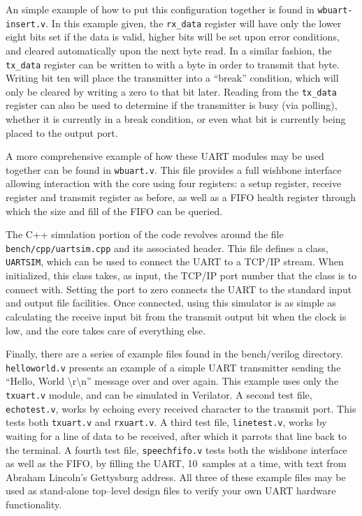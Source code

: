 \documentclass{gqtekspec}
\begin{document}
An simple example of how to put this configuration together is found in
{\tt wbuart-insert.v}.  In this example given, the {\tt rx\_data} register
will have only the lower eight bits set if the data is valid, higher bits will
be set upon error conditions, and cleared automatically upon the next byte read.
In a similar fashion, the {\tt tx\_data} register can be written to with a byte
in order to transmit that byte.  Writing bit ten will place the transmitter
into a ``break'' condition, which will only be cleared by writing a zero to
that bit later.
Reading from the {\tt tx\_data} register can also be used to determine if the
transmitter is busy (via polling), whether it is currently in a break condition,
or even what bit is currently being placed to the output port.

A more comprehensive example of how these UART modules may be used together
can be found in {\tt wbuart.v}.  This file provides a full wishbone interface
allowing interaction with the core using four registers: a setup register,
receive register and transmit register as before, as well as a FIFO health
register through which the size and fill of the FIFO can be queried.

The C++ simulation portion of the code revolves around the file
{\tt bench/cpp/uartsim.cpp} and its associated header.  This file defines a 
class, {\tt UARTSIM}, which can be used to connect the UART to a TCP/IP stream.
When initialized, this class takes, as input, the TCP/IP port number that the
class is to connect with.  Setting the port to zero connects the UART to
the standard input and output file facilities.  Once connected, using this
simulator is as simple as calculating the receive input bit from the transmit
output bit when the clock is low, and the core takes care of everything else.

Finally, there are a series of example files found in the bench/verilog
directory.  {\tt helloworld.v} presents an example of a simple UART transmitter
sending the ``Hello, World {\textbackslash}r{\textbackslash}n'' message over
and over again.  This example
uses only the {\tt txuart.v} module, and can be simulated in Verilator.
A second test file, {\tt echotest.v}, works by echoing every received character
to the transmit port.
This tests both {\tt txuart.v} and {\tt rxuart.v}. 
A third test file, {\tt linetest.v}, works by waiting for a line of data to be
received, after which it parrots that line back to the terminal. 
A fourth test file, {\tt speechfifo.v} tests both the wishbone interface as
well as the FIFO, by filling the UART, 10~samples at a time, with text from
Abraham Lincoln's Gettysburg address.
All three of these example files may be used as stand-alone top--level design
files to verify your own UART hardware functionality.
\end{document}
